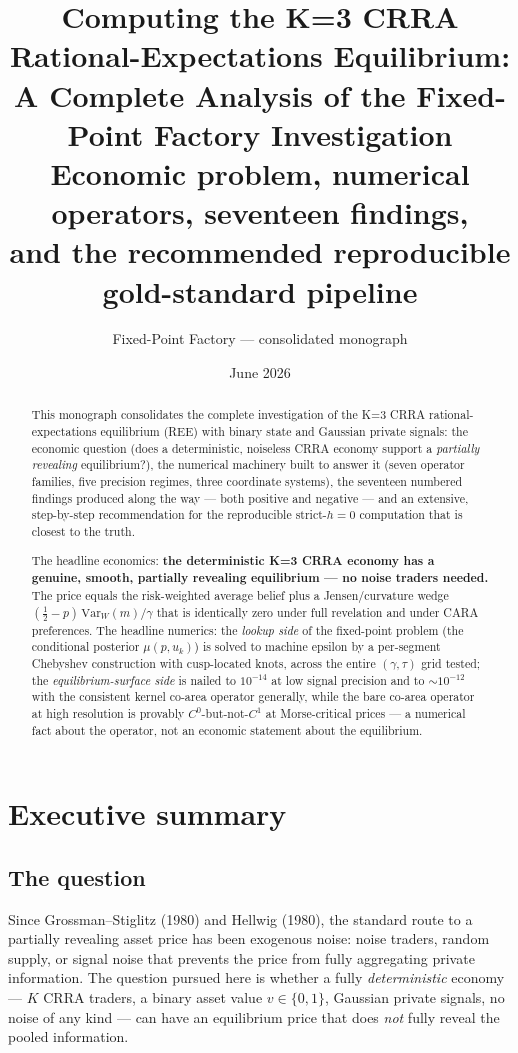 \documentclass[11pt]{report}
\title{\textbf{Computing the K=3 CRRA Rational-Expectations Equilibrium:}\\
A Complete Analysis of the Fixed-Point Factory Investigation\\[1ex]
\large Economic problem, numerical operators, seventeen findings,\\
and the recommended reproducible \strict{} gold-standard pipeline}
\author{Fixed-Point Factory --- consolidated monograph}
\date{June 2026}
\newcommand{\strict}{strict-$h{=}0$}
\begin{document}
\maketitle

\begin{abstract}
\noindent
This monograph consolidates the complete investigation of the K=3 CRRA
rational-expectations equilibrium (REE) with binary state and Gaussian
private signals: the economic question (does a deterministic, noiseless
CRRA economy support a \emph{partially revealing} equilibrium?), the
numerical machinery built to answer it (seven operator families, five
precision regimes, three coordinate systems), the seventeen numbered
findings produced along the way --- both positive and negative --- and an
extensive, step-by-step recommendation for the reproducible
\strict{} computation that is closest to the truth.

The headline economics: \textbf{the deterministic K=3 CRRA economy has a
genuine, smooth, partially revealing equilibrium --- no noise traders
needed.} The price equals the risk-weighted average belief plus a
Jensen/curvature wedge $(\tfrac12 - p)\,\mathrm{Var}_W(m)/\gamma$ that
is identically zero under full revelation and under CARA preferences.
The headline numerics: the \emph{lookup side} of the fixed-point problem
(the conditional posterior $\mu(p, u_k)$) is solved to machine epsilon by
a per-segment Chebyshev construction with cusp-located knots, across the
entire $(\gamma,\tau)$ grid tested; the \emph{equilibrium-surface side}
is nailed to $10^{-14}$ at low signal precision and to $\sim 10^{-12}$
with the consistent kernel co-area operator generally, while the bare
co-area operator at high resolution is provably $C^0$-but-not-$C^1$ at
Morse-critical prices --- a numerical fact about the operator, not an
economic statement about the equilibrium.
\end{abstract}

\tableofcontents
\listoffigures

\chapter*{Executive summary}

\section*{The question}
Since Grossman--Stiglitz (1980) and Hellwig (1980), the standard route to
a partially revealing asset price has been exogenous noise: noise
traders, random supply, or signal noise that prevents the price from
fully aggregating private information. The question pursued here is
whether a fully \emph{deterministic} economy --- $K$ CRRA traders, a binary
asset value $v \in \{0,1\}$, Gaussian private signals, no noise of any
kind --- can have an equilibrium price that does \emph{not} fully reveal
the pooled information.
\end{document}
